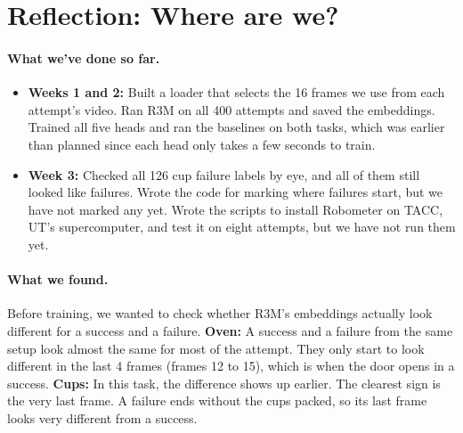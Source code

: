 \documentclass{article}
\begin{document}

\section{Reflection: Where are we?}

\paragraph{What we've done so far.}
\begin{itemize}
    \item \textbf{Weeks 1 and 2:} Built a loader that selects the 16 frames we use from each attempt's video. Ran R3M on all 400 attempts and saved the embeddings. Trained all five heads and ran the baselines on both tasks, which was earlier than planned since each head only takes a few seconds to train.
    \item \textbf{Week 3:} Checked all 126 cup failure labels by eye, and all of them still looked like failures. Wrote the code for marking where failures start, but we have not marked any yet. Wrote the scripts to install Robometer on TACC, UT's supercomputer, and test it on eight attempts, but we have not run them yet.
\end{itemize}

\paragraph{What we found.} Before training, we wanted to check whether R3M's embeddings actually look different for a success and a failure. \textbf{Oven:} A success and a failure from the same setup look almost the same for most of the attempt. They only start to look different in the last 4 frames (frames 12 to 15), which is when the door opens in a success. \textbf{Cups:} In this task, the difference shows up earlier. The clearest sign is the very last frame. A failure ends without the cups packed, so its last frame looks very different from a success.
\end{document}
